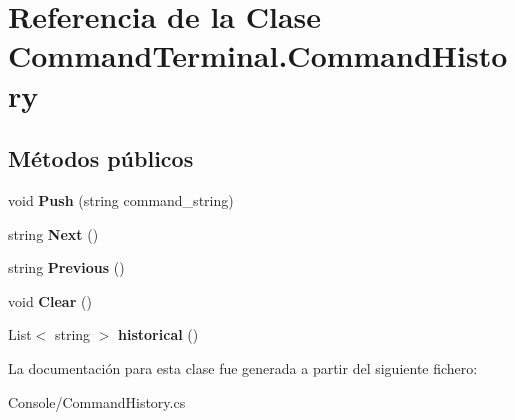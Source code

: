 \hypertarget{class_command_terminal_1_1_command_history}{}\section{Referencia de la Clase Command\+Terminal.\+Command\+History}
\label{class_command_terminal_1_1_command_history}
\subsection*{Métodos públicos}
\begin{DoxyCompactItemize}
\item 
\mbox{\label{class_command_terminal_1_1_command_history_a468cb902b41754b3e754e87b64604dd8}} 
void {\bfseries Push} (string command\+\_\+string)
\item 
\mbox{\label{class_command_terminal_1_1_command_history_a327941f014bc3b59b59a0aab9fbd41c8}} 
string {\bfseries Next} ()
\item 
\mbox{\label{class_command_terminal_1_1_command_history_a96c5dbea923ca72fd0e2f400baa681c4}} 
string {\bfseries Previous} ()
\item 
\mbox{\label{class_command_terminal_1_1_command_history_a5882c8ea71e4799986a8aea0cf4fd1e7}} 
void {\bfseries Clear} ()
\item 
\mbox{\label{class_command_terminal_1_1_command_history_aa67f82a3aacf47ce9396178fac60dd40}} 
List$<$ string $>$ {\bfseries historical} ()
\end{DoxyCompactItemize}


La documentación para esta clase fue generada a partir del siguiente fichero\+:\begin{DoxyCompactItemize}
\item 
Console/Command\+History.\+cs\end{DoxyCompactItemize}
